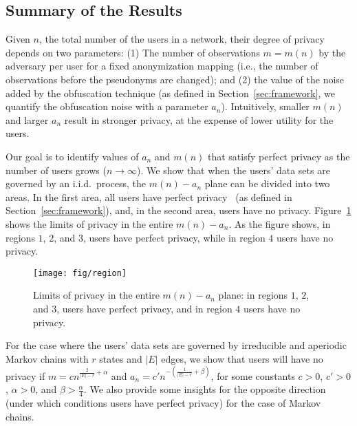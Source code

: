 \subsection{Summary of the Results}

Given $n$, the total number of the users in a network, their degree of privacy depends 
on two parameters: (1) The number of observations $m=m(n)$ by the adversary per user for a fixed anonymization mapping (i.e., the number of observations before the pseudonyms are changed);  and (2) the value of the noise added by the obfuscation technique (as defined in Section~\ref{sec:framework}, we quantify the obfuscation noise with a parameter $a_n$).  
Intuitively, smaller $m(n)$ and larger $a_n$ result in stronger privacy, at the expense of lower utility for the users. 

Our goal is to identify values of $a_n$ and $m(n)$  that satisfy perfect privacy as the number of users grows ($n \rightarrow \infty$).
%
We show that when the users' data sets are governed by an i.i.d.\ process, 
the $m(n)- a_n$ plane can be divided into two areas.  In the first area, all users have perfect privacy~\cite{tifs2016} (as defined in Section~\ref{sec:framework}), and, in the second area, users have no privacy.  
Figure~\ref{fig:region} shows the limits of privacy in the entire $m(n)- a_n$. 
As the figure shows, in regions $1$, $2$, and $3$, users have perfect privacy, while in region $4$ users have no privacy.
\begin{figure}[h]
	\centering
	\texttt{[image: fig/region]}
	\caption{Limits of privacy in the entire $m(n)-a_n$ plane: in regions $1$, $2$, and $3$, users have perfect privacy, and in region $4$ users have no privacy.}
	\label{fig:region}
\end{figure}

For the case where the users' data sets are governed by irreducible and aperiodic Markov chains with $r$ states and $|E|$ edges, we show that users will have no privacy if $m =cn^{\frac{2}{|E|-r} +  \alpha}$ and $a_n =c'n^{-\left(\frac{1}{|E|-r}+\beta \right)}$, for some constants $c>0$, $c'>0$, $\alpha>0$, and $\beta>\frac{\alpha}{4}$. We also provide some insights for the opposite direction (under which conditions users have perfect privacy) for the case of Markov chains. 




  





